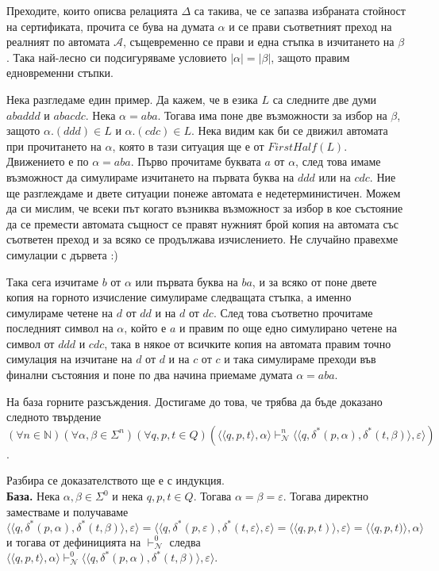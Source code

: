 \documentclass[12pt]{article}
\begin{document}
Преходите, които описва релацията \(\Delta\) са такива, че се запазва избраната стойност на сертификата,
прочита се бува на думата \(\alpha\) и се прави съответният преход на реалният по автомата \(\mathcal A\),
същевременно се прави и една стъпка в изчитането на \(\beta\). Така най-лесно си подсигуряваме условието \(|\alpha| = |\beta|\), защото правим едновременни стъпки.

Нека разгледаме един пример. Да кажем, че в езика \(L\) са следните две думи \(abaddd\) и \(abacdc\).
Нека \(\alpha = aba\). Тогава има поне две възможности за избор на \(\beta\), защото \(\alpha.(ddd) \in L\) и \(\alpha.(cdc) \in L\). Нека видим как би се движил автомата при прочитането на \(\alpha\), която в тази ситуация ще е от \(FirstHalf(L)\). Движението е по \(\alpha = aba\). Първо прочитаме буквата \(a\) от \(\alpha\), след това имаме възможност да симулираме изчитането на първата буква на \(ddd\) или на \(cdc\).
Ние ще разглеждаме и двете ситуации понеже автомата е недетерминистичен. Можем да си мислим, че всеки път когато възниква възможност за избор в кое състояние да се премести автомата същност се правят нужният брой копия на автомата със съответен преход и за всяко се продължава изчислението. Не случайно правехме симулации с дървета :)

Така сега изчитаме \(b\) от \(\alpha\) или първата буква на \(ba\), и за всяко от поне двете копия на горното изчисление симулираме следващата стъпка, а именно симулираме четене на \(d\) от \(dd\) и на \(d\) от \(dc\). След това съответно прочитаме последният символ на \(\alpha\), който е \(a\) и правим по още едно симулирано четене на символ от \(ddd\) и \(cdc\), така в някое от всичките копия на автомата правим точно симулация на изчитане на \(d\) от \(d\) и на \(c\) от \(c\) и така симулираме преходи във финални състояния и поне по два начина приемаме думата \(\alpha = aba\).

На база горните разсъждения. Достигаме до това, че трябва да бъде доказано следното твърдение \\

\((\forall n \in \mathbb N)(\forall \alpha, \beta \in \Sigma^n)(\forall q, p, t \in Q)(\langle \langle q, p, t \rangle, \alpha \rangle \vdash_{\mathcal N}^n  \langle \langle q, \delta^*(p, \alpha), \delta^*(t, \beta) \rangle, \varepsilon \rangle )\).

Разбира се доказателството ще е с индукция. \\

\textbf{База.} Нека \(\alpha, \beta \in \Sigma^0\) и нека \(q, p, t \in Q\).
Тогава \(\alpha = \beta = \varepsilon\). Тогава директно заместваме и получаваме
\(\langle \langle q, \delta^*(p, \alpha), \delta^*(t, \beta) \rangle, \varepsilon \rangle =
\langle \langle q, \delta^*(p, \varepsilon), \delta^*(t, \varepsilon \rangle, \varepsilon \rangle =
\langle \langle q, p, t) \rangle, \varepsilon \rangle = 
\langle \langle q, p, t) \rangle, \alpha \rangle\) и тогава от дефиницията на \(\vdash_{\mathcal N}^0\) следва
\(\langle \langle q, p, t \rangle, \alpha \rangle \vdash_{\mathcal N}^0  \langle \langle q, \delta^*(p, \alpha), \delta^*(t, \beta) \rangle, \varepsilon \rangle\). \\
\end{document}
